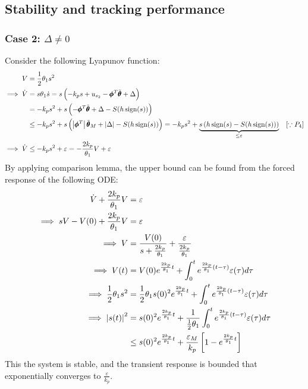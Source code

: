 \subsection{Stability and tracking performance}
\subsubsection{Case 2: $\Delta \neq 0$}
Consider the following Lyapunov function:
\begin{align*}
    V &= \frac{1}{2} \theta_1 s^2\\
    \implies \dot V &= s \theta_1 \dot s = s \left( -k_p s + u_{s_2} - \pmb \phi^T \tilde{\pmb \theta} + \Delta  \right)\\
    &= -k_p s^2 + s \left( -\pmb \phi^T \tilde{\pmb \theta} + \Delta - S(h \,\text{sign}(s)) \right)\\
    &\leq -k_p s^2 + s \left( \left\lvert \pmb \phi^T \right\rvert \tilde{\pmb \theta}_M + \left\lvert \Delta \right\rvert - S(h \,\text{sign}(s)) \right)
    = -k_p s^2 + \underbrace{s \left( h\,\text{sign}(s)- S(h \,\text{sign}(s)) \right)}_{\leq \varepsilon} \quad [\because P_4] \\
    \implies \dot V &\leq -k_p s^2 + \varepsilon = - \frac{2 k_p}{\theta_1} V + \varepsilon
\end{align*}
By applying comparison lemma, the upper bound can be found from the forced
response of the following ODE:
\begin{align*}
    \dot V + \frac{2 k_p}{\theta_1} V &= \varepsilon\\
    \implies sV - V(0) + \frac{2 k_p}{\theta_1} V &= \varepsilon\\
    \implies V &= \frac{V(0)}{s + \frac{2 k_p}{\theta_1}} + \frac{\varepsilon}{\frac{2 k_p}{\theta_1}}\\
    \implies V(t) &= V(0)e^{\frac{2 k_p}{\theta_1} t} + \int_0^t{e^{\frac{2 k_p}{\theta_1} (t-\tau)} \varepsilon(\tau) d\tau}\\
    \implies \frac{1}{2} \theta_1 s^2 &= \frac{1}{2} \theta_1 s(0)^2 e^{\frac{2 k_p}{\theta_1} t} + \int_0^t{e^{\frac{2 k_p}{\theta_1} (t-\tau)} \varepsilon(\tau) d\tau}\\
    \implies \left\lvert s(t) \right\rvert^2 &= s(0)^2 e^{\frac{2 k_p}{\theta_1} t} +\frac{1}{\frac{1}{2} \theta_1 } \int_0^t{e^{\frac{2 k_p}{\theta_1} (t-\tau)} \varepsilon(\tau) d\tau}\\
    &\leq s(0)^2 e^{\frac{2 k_p}{\theta_1} t} + \frac{\varepsilon_M}{k_p} \left[1 -  e^{\frac{2 k_p}{\theta_1} t} \right]\\
\end{align*}
This the system is stable, and the transient response is bounded that
exponentially converges to $\frac{\varepsilon}{k_p}$.
